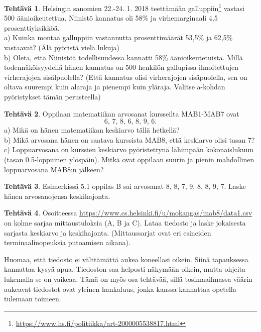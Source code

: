 \documentclass[12pt,leqno,a4paper,oneside]{amsart}
\theoremstyle{definition}
\newtheorem{exercise}{Tehtävä}
\theoremstyle{remark}
\numberwithin{equation}{section}
\begin{document}
\begin{exercise}
Helsingin sanomien 22.-24. 1. 2018 teettämään galluppiin\footnote{\url{https://www.hs.fi/politiikka/art-2000005538817.html}} 
vastasi 500 äänioikeutettua. Niinistö kannatus oli 58\% ja virhemarginaali 4,5 prosenttiyksikköä.\\
a) Kuinka montaa galluppiin vastannutta prosenttimäärät 53,5\% ja 62,5\% vastaavat? (Älä pyöristä vielä lukuja)\\
b) Oleta, että Niinistöä todellisuudessa kannatti 58\% äänioikeutetuista. Millä todennäköisyydellä hänen kannatus on 
500 henkilön gallupissa ilmoitettujen virherajojen sisälpuolella? (Että kannatus olisi virherajojen sisäpuolella, sen on oltava suurempi
kuin alaraja ja pienempi kuin yläraja. Valitse a-kohdan pyöristykset tämän perusteella)
\end{exercise}



\begin{exercise}
 Oppilaan matematiikan arvosanat kursseilta MAB1-MAB7 ovat
 $$6,\, 7,\, 8,\, 6,\, 8,\, 9,\, 6.$$
 a) Mikä on hänen matematiikan keskiarvo tällä hetkellä?\\
 b) Mikä arvosana hänen on saatava kurssista MAB8, että keskiarvo olisi tasan 7?\\
 c) Loppuarvosana on kurssien keskiarvo pyöristettynä lähimpään kokonaislukuun (tasan 0.5-loppuinen ylöspäin).
 Mitkä ovat oppilaan suurin ja pienin mahdollinen loppuarvosana MAB8:n jälkeen?
\end{exercise}


\begin{exercise}
Esimerkissä 5.1 oppilas B sai arvosanat 8, 8, 7, 9, 8, 8, 9, 7. Laske hänen arvosanojensa keskihajonta.
\end{exercise}


\begin{exercise}
 Osoitteessa \url{https://www.cs.helsinki.fi/u/mokangas/mab8/data1.csv} on kolme sarjaa mittaustuloksia (A, B ja C). 
 Lataa tiedosto ja laske jokaisesta sarjasta keskiarvo ja keskihajonta. 
 (Mittaussarjat ovat eri esineiden terminaalinopeuksia putoamisen aikana).
 
 Huomaa, että tiedosto ei välttämättä aukea koneellasi oikein. Siinä tapauksessa kannattaa kysyä apua. Tiedoston saa helposti näkymään 
 oikein, mutta ohjeita lukemalla se on vaikeaa. Tämä on myös osa tehtävää, sillä tosimaailmassa väärin aukeavat tiedostot ovat yleinen 
 hankaluus, jonka kanssa kannattaa opetella tulemaan toimeen.
\end{exercise}
\end{document}
